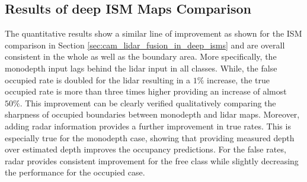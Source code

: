 \subsection{Results of deep ISM Maps Comparison}
\label{subsec:results_analyze_deep_ism_maps_diff_sensors}
The quantitative results show a similar line of improvement as shown for the ISM comparison in Section \ref{sec:cam_lidar_fusion_in_deep_isms} and are overall consistent in the whole as well as the boundary area. More specifically, the \gls{monodepth} input lags behind the lidar input in all classes. While, the false occupied rate is doubled for the lidar resulting in a $1\%$ increase, the true occupied rate is more than three times higher providing an increase of almost $50\%$. This improvement can be clearly verified qualitatively comparing the sharpness of occupied boundaries between \gls{monodepth} and lidar maps. Moreover, adding radar information provides a further improvement in true rates. This is especially true for the \gls{monodepth} case, showing that providing measured depth over estimated depth improves the occupancy predictions. For the false rates, radar provides consistent improvement for the free class while slightly decreasing the performance for the occupied case.
